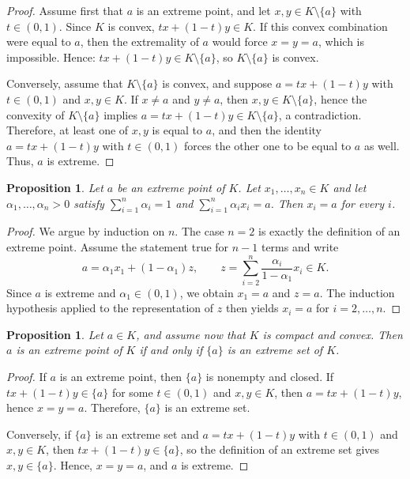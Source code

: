 \documentclass[reqno]{amsart}
\newtheorem{proposition}[theorem]{Proposition}
\theoremstyle{definition}
\begin{document}
\begin{proof}
Assume first that $a$ is an extreme point, and let $x,y \in K \setminus \{a\}$ with
$t \in (0,1)$. Since $K$ is convex, $tx + (1-t)y \in K$. If this convex combination were equal to $a$, then the extremality of $a$ would force $x = y = a$, which is impossible. Hence:
$tx + (1-t)y \in K \setminus \{a\}$, so $K \setminus \{a\}$ is convex.

Conversely, assume that $K \setminus \{a\}$ is convex, and suppose
$a = tx + (1-t)y$ with $t \in (0,1)$ and $x,y \in K$. If $x \neq a$ and $y \neq a$, then
$x,y \in K \setminus \{a\}$, hence the convexity of $K \setminus \{a\}$ implies
$a = tx + (1-t)y \in K \setminus \{a\}$, a contradiction. Therefore, at least one of $x,y$ is
equal to $a$, and then the identity $a = tx + (1-t)y$ with $t \in (0,1)$ forces the other one to
be equal to $a$ as well. Thus, $a$ is extreme.
\end{proof}

\begin{proposition}\label{prop:finite-combination}
Let $a$ be an extreme point of $K$. Let $x_1,\dots,x_n \in K$ and let
$\alpha_1,\dots,\alpha_n > 0$ satisfy $\sum_{i=1}^n \alpha_i = 1$ and
$\sum_{i=1}^n \alpha_i x_i = a$. Then $x_i = a$ for every $i$.
\end{proposition}

\begin{proof}
We argue by induction on $n$. The case $n=2$ is exactly the definition of an extreme point.
Assume the statement true for $n-1$ terms and write
\begin{equation*}
    a = \alpha_1 x_1 + (1-\alpha_1)z, \qquad
    z = \sum_{i=2}^n \dfrac{\alpha_i}{1-\alpha_1} x_i \in K.
\end{equation*}
Since $a$ is extreme and $\alpha_1 \in (0,1)$, we obtain $x_1 = a$ and $z = a$. The induction
hypothesis applied to the representation of $z$ then yields $x_i = a$ for $i=2,\dots,n$.
\end{proof}

\begin{proposition}\label{prop:singleton-face}
Let $a \in K$, and assume now that $K$ is compact and convex. Then $a$ is an extreme point of
$K$ if and only if $\{a\}$ is an extreme set of $K$.
\end{proposition}

\begin{proof}
If $a$ is an extreme point, then $\{a\}$ is nonempty and closed. If
$tx + (1-t)y \in \{a\}$ for some $t \in (0,1)$ and $x,y \in K$, then
$a = tx + (1-t)y$, hence $x = y = a$. Therefore, $\{a\}$ is an extreme set.

Conversely, if $\{a\}$ is an extreme set and $a = tx + (1-t)y$ with $t \in (0,1)$ and
$x,y \in K$, then $tx + (1-t)y \in \{a\}$, so the definition of an extreme set gives
$x,y \in \{a\}$. Hence, $x = y = a$, and $a$ is extreme.
\end{proof}
\end{document}
